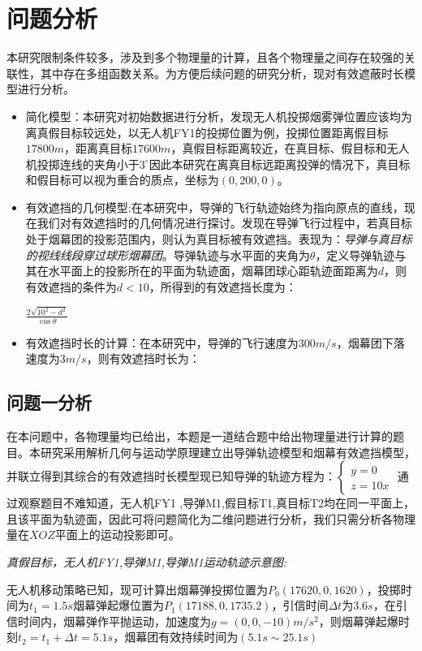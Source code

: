 \documentclass{article}
\begin{document}
\section{问题分析}
本研究限制条件较多，涉及到多个物理量的计算，且各个物理量之间存在较强的关联性，其中存在多组函数关系。为方便后续问题的研究分析，现对有效遮蔽时长模型进行分析。

\begin{itemize}
    \item 简化模型：本研究对初始数据进行分析，发现无人机投掷烟雾弹位置应该均为离真假目标较远处，以无人机FY1的投掷位置为例，投掷位置距离假目标$17800m$，距离真目标$17600m$，真假目标距离较近，在真目标、假目标和无人机投掷连线的夹角小于$3^\circ$因此本研究在离真目标远距离投弹的情况下，真目标和假目标可以视为重合的质点，坐标为$(0,200,0)$。
    \item 有效遮挡的几何模型:在本研究中，导弹的飞行轨迹始终为指向原点的直线，现在我们对有效遮挡时的几何情况进行探讨。发现在导弹飞行过程中，若真目标处于烟幕团的投影范围内，则认为真目标被有效遮挡。表现为：\textit{导弹与真目标的视线线段穿过球形烟幕团}。导弹轨迹与水平面的夹角为$\theta$，定义导弹轨迹与其在水平面上的投影所在的平面为轨迹面，烟幕团球心距轨迹面距离为$d$，则有效遮挡的条件为$d<10$，所得到的有效遮挡长度为：
    \begin{center}
        $\displaystyle \frac{2\sqrt{10^2-d^2}}{\cos\theta}$
    \end{center}
    \item 有效遮挡时长的计算：在本研究中，导弹的飞行速度为$300m/s$，烟幕团下落速度为$3m/s$，则有效遮挡时长为：
\end{itemize}
\subsection{问题一分析}
在本问题中，各物理量均已给出，本题是一道结合题中给出物理量进行计算的题目。本研究采用解析几何与运动学原理建立出导弹轨迹模型和烟幕有效遮挡模型，并联立得到其综合的有效遮挡时长模型现已知导弹的轨迹方程为：$\begin{cases}
    y = 0 \\
    z = 10x
\end{cases}$
通过观察题目不难知道，无人机FY1 ,导弹M1,假目标T1,真目标T2均在同一平面上，且该平面为轨迹面，因此可将问题简化为二维问题进行分析，我们只需分析各物理量在$XOZ$平面上的运动投影即可。

\textit{真假目标，无人机FY1,导弹M1,导弹M1运动轨迹示意图:}


无人机移动策略已知，现可计算出烟幕弹投掷位置为$P_0(17620,0,1620)$，投掷时间为$t_1 = 1.5s$烟幕弹起爆位置为$P_1(17188,0,1735.2)$，引信时间$\Delta t$为$3.6s$，在引信时间内，烟幕弹作平抛运动，加速度为$g = (0,0,-10)$$m/s^2$，则烟幕弹起爆时刻$t_2 = t_1 + \Delta t = 5.1s$，烟幕团有效持续时间为$(5.1s \sim25.1s)$
\end{document}
